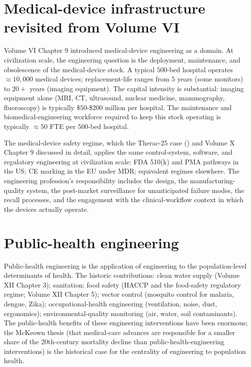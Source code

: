 \section{Medical-device infrastructure revisited from Volume VI}

Volume VI Chapter 9 introduced medical-device engineering as a domain. At civilization scale, the engineering question is the deployment, maintenance, and obsolescence of the medical-device stock. A typical $500$-bed hospital operates $\approx 10{,}000$ medical devices; replacement-life ranges from $5$ years (some monitors) to $20+$ years (imaging equipment). The capital intensity is substantial: imaging equipment alone (MRI, CT, ultrasound, nuclear medicine, mammography, fluoroscopy) is typically $\$50$-$\$200$ million per hospital. The maintenance and biomedical-engineering workforce required to keep this stock operating is typically $\approx 50$ FTE per $500$-bed hospital.

The medical-device safety regime, which the Therac-25 case (\cite{paper:leveson-turner1993}) and Volume X Chapter 9 discussed in detail, applies the same control-system, software, and regulatory engineering at civilization scale: FDA 510(k) and PMA pathways in the US; CE marking in the EU under MDR; equivalent regimes elsewhere. The engineering profession's responsibility includes the design, the manufacturing-quality system, the post-market surveillance for unanticipated failure modes, the recall processes, and the engagement with the clinical-workflow context in which the devices actually operate.

\section{Public-health engineering}

Public-health engineering is the application of engineering to the population-level determinants of health. The historic contributions: clean water supply (Volume XII Chapter 3); sanitation; food safety (HACCP and the food-safety regulatory regime; Volume XII Chapter 5); vector control (mosquito control for malaria, dengue, Zika); occupational-health engineering (ventilation, noise, dust, ergonomics); environmental-quality monitoring (air, water, soil contaminants). The public-health benefits of these engineering interventions have been enormous; the McKeown thesis (that medical-care advances are responsible for a smaller share of the 20th-century mortality decline than public-health-engineering interventions) is the historical case for the centrality of engineering to population health.

